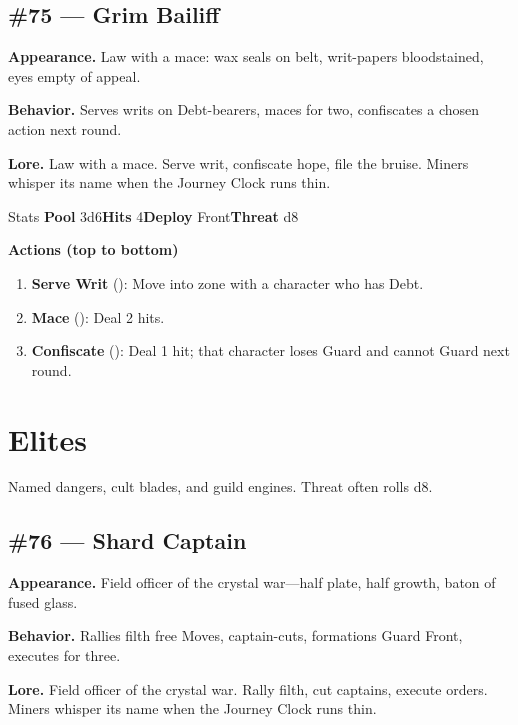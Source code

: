 \subsection*{\#75 --- Grim Bailiff}

\textbf{Appearance.} Law with a mace: wax seals on belt, writ-papers bloodstained, eyes empty of appeal.

\textbf{Behavior.} Serves writs on Debt-bearers, maces for two, confiscates a chosen action next round.

\textbf{Lore.} Law with a mace. Serve writ, confiscate hope, file the bruise. Miners whisper its name when the Journey Clock runs thin.

\begin{monsterentry}{Stats}
\textbf{Pool} 3d6\quad\textbf{Hits} 4\quad\textbf{Deploy} Front\quad\textbf{Threat} d8

\textbf{Actions (top to bottom)}
\begin{enumerate}\setlength{\itemsep}{0.15em}\setlength{\parskip}{0pt}
  \item \textbf{Serve Writ} (\easy): Move into zone with a character who has Debt.
  \item \textbf{Mace} (\medium): Deal 2 hits.
  \item \textbf{Confiscate} (\hard): Deal 1 hit; that character loses Guard and cannot Guard next round.
\end{enumerate}
\end{monsterentry}

\section{Elites}

Named dangers, cult blades, and guild engines. Threat often rolls d8.

\subsection*{\#76 --- Shard Captain}

\textbf{Appearance.} Field officer of the crystal war---half plate, half growth, baton of fused glass.

\textbf{Behavior.} Rallies filth free Moves, captain-cuts, formations Guard Front, executes for three.

\textbf{Lore.} Field officer of the crystal war. Rally filth, cut captains, execute orders. Miners whisper its name when the Journey Clock runs thin.

